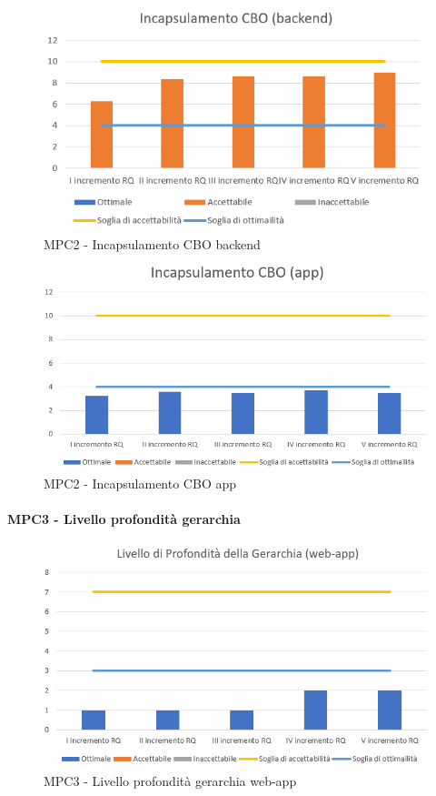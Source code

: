   \begin{figure}[h!]
    \centering
      \includegraphics[scale=1]{Immagini/CBO BE.PNG}
    \caption{MPC2 - Incapsulamento CBO backend}
  \end{figure}

  \begin{figure}[h!]
    \centering
      \includegraphics[scale=1]{Immagini/CBO APP.PNG}
    \caption{MPC2 - Incapsulamento CBO app}
  \end{figure}


  \clearpage
  \paragraph{MPC3 - Livello profondità gerarchia}
  \begin{figure}[h!]
    \centering
      \includegraphics[scale=1]{Immagini/LivProGer WA.PNG}
    \caption{MPC3 - Livello profondità gerarchia web-app}
  \end{figure}

